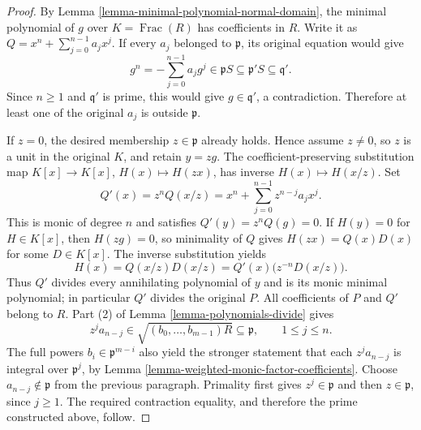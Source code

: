 \begin{proof}
\medskip\noindent
By Lemma \ref{lemma-minimal-polynomial-normal-domain}, the
minimal polynomial of $g$ over $K=\operatorname{Frac}(R)$ has
coefficients in $R$. Write it as
$Q=x^n+\sum_{j=0}^{n-1}a_jx^j$. If every $a_j$ belonged to
$\mathfrak p$, its original equation would give
$$
g^n=-\sum_{j=0}^{n-1}a_jg^j\in\mathfrak pS
\subseteq\mathfrak p'S\subseteq\mathfrak q'.
$$
Since $n\geq1$ and $\mathfrak q'$ is prime, this would give
$g\in\mathfrak q'$, a contradiction. Therefore at least one
of the original $a_j$ is outside $\mathfrak p$.

\medskip\noindent
If $z=0$, the desired membership $z\in\mathfrak p$ already
holds. Hence assume $z\ne0$, so $z$ is a unit in the original
$K$, and retain $y=zg$. The coefficient-preserving substitution
map $K[x]\to K[x]$, $H(x)\mapsto H(zx)$, has inverse
$H(x)\mapsto H(x/z)$. Set
$$
Q'(x)=z^nQ(x/z)
=x^n+\sum_{j=0}^{n-1}z^{n-j}a_jx^j.
$$
This is monic of degree $n$ and satisfies
$Q'(y)=z^nQ(g)=0$. If $H(y)=0$ for $H\in K[x]$, then
$H(zg)=0$, so minimality of $Q$ gives $H(zx)=Q(x)D(x)$
for some $D\in K[x]$. The inverse substitution yields
$$
H(x)=Q(x/z)D(x/z)=Q'(x)\bigl(z^{-n}D(x/z)\bigr).
$$
Thus $Q'$ divides every annihilating polynomial of $y$ and is
its monic minimal polynomial; in particular $Q'$ divides the
original $P$. All coefficients of $P$ and $Q'$ belong to $R$.
Part (2) of Lemma \ref{lemma-polynomials-divide} gives
$$
z^ja_{n-j}\in\sqrt{(b_0,\ldots,b_{m-1})R}
\subseteq\mathfrak p,\qquad 1\leq j\leq n.
$$
The full powers $b_i\in\mathfrak p^{m-i}$ also yield the
stronger statement that each $z^ja_{n-j}$ is integral over
$\mathfrak p^j$, by
Lemma \ref{lemma-weighted-monic-factor-coefficients}.
Choose $a_{n-j}\notin\mathfrak p$ from the previous paragraph.
Primality first gives $z^j\in\mathfrak p$ and then
$z\in\mathfrak p$, since $j\geq1$. The required contraction
equality, and therefore the prime constructed above, follow.
\end{proof}